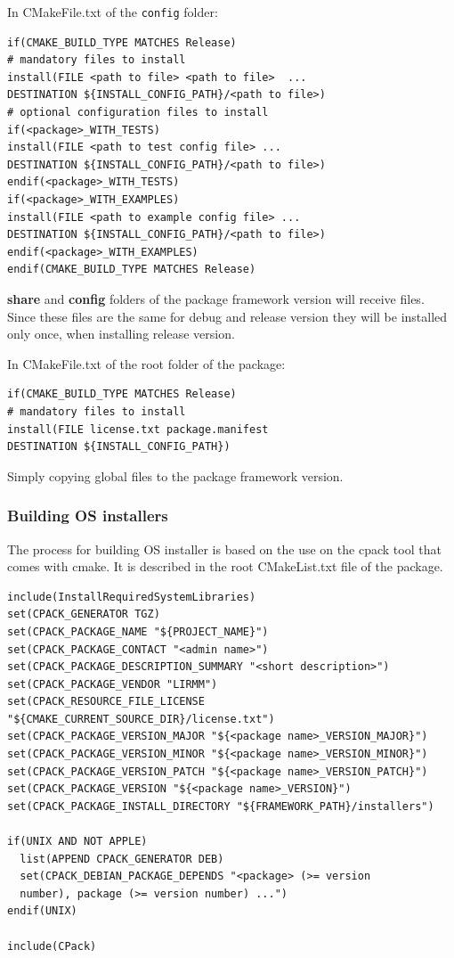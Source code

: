 \documentclass[12pt,a4paper]{article}
\begin{document}
In CMakeFile.txt of the \texttt{config} folder:
\begin{verbatim}
if(CMAKE_BUILD_TYPE MATCHES Release)
# mandatory files to install
install(FILE <path to file> <path to file>  ...
DESTINATION ${INSTALL_CONFIG_PATH}/<path to file>)
# optional configuration files to install
if(<package>_WITH_TESTS)
install(FILE <path to test config file> ...
DESTINATION ${INSTALL_CONFIG_PATH}/<path to file>)
endif(<package>_WITH_TESTS)
if(<package>_WITH_EXAMPLES)
install(FILE <path to example config file> ...
DESTINATION ${INSTALL_CONFIG_PATH}/<path to file>)
endif(<package>_WITH_EXAMPLES)
endif(CMAKE_BUILD_TYPE MATCHES Release)
\end{verbatim}
\textbf{share} and \textbf{config} folders of the package framework version will receive files. Since these files are the same for debug and release version they will be installed only once, when installing release version.

In CMakeFile.txt of the root folder of the package:
\begin{verbatim}
if(CMAKE_BUILD_TYPE MATCHES Release)
# mandatory files to install
install(FILE license.txt package.manifest
DESTINATION ${INSTALL_CONFIG_PATH})
\end{verbatim}
Simply copying global files to the package framework version.


\subsubsection{Building OS installers}

The process for building OS installer is based on the use on the cpack tool that comes with cmake. It is described in the root CMakeList.txt file of the package.

\begin{verbatim}
include(InstallRequiredSystemLibraries)
set(CPACK_GENERATOR TGZ)
set(CPACK_PACKAGE_NAME "${PROJECT_NAME}")
set(CPACK_PACKAGE_CONTACT "<admin name>")
set(CPACK_PACKAGE_DESCRIPTION_SUMMARY "<short description>")
set(CPACK_PACKAGE_VENDOR "LIRMM")
set(CPACK_RESOURCE_FILE_LICENSE "${CMAKE_CURRENT_SOURCE_DIR}/license.txt")
set(CPACK_PACKAGE_VERSION_MAJOR "${<package name>_VERSION_MAJOR}")
set(CPACK_PACKAGE_VERSION_MINOR "${<package name>_VERSION_MINOR}")
set(CPACK_PACKAGE_VERSION_PATCH "${<package name>_VERSION_PATCH}")
set(CPACK_PACKAGE_VERSION "${<package name>_VERSION}")
set(CPACK_PACKAGE_INSTALL_DIRECTORY "${FRAMEWORK_PATH}/installers")

if(UNIX AND NOT APPLE)
  list(APPEND CPACK_GENERATOR DEB)  
  set(CPACK_DEBIAN_PACKAGE_DEPENDS "<package> (>= version 
  number), package (>= version number) ...")
endif(UNIX)

include(CPack)
\end{verbatim}
\end{document}
